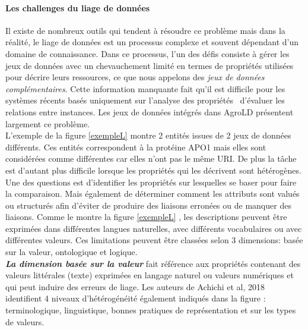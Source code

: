 \paragraph{Les challenges du liage de données}
Il existe de nombreux outils qui tendent à résoudre ce problème mais dans la réalité, le liage de données est un processus complexe et souvent dépendant d'un domaine de connaissance. Dans ce processus, l'un des défis consiste à gérer les jeux de données avec un chevauchement limité en termes de propriétés utilisées pour décrire leurs ressources, ce que nous appelons des \textit{jeux de données complémentaires}. Cette information manquante fait qu'il est difficile pour les systèmes récents basés uniquement sur l'analyse des propriétés~\cite{Jentzsch,Ngomo2011} d'évaluer les relations entre instances. Les jeux de données intégrés dans AgroLD présentent largement ce problème. \\

L’exemple de la figure \ref{exempleL} montre 2 entités issues de 2 jeux de données différents. Ces entités correspondent à la protéine APO1 mais elles sont considérées comme différentes car elles n’ont pas le même URI. De plus la tâche est d'autant plus difficile lorsque les propriétés qui les décrivent sont hétérogènes. Une des questions est d'identifier les propriétés sur lesquelles se baser pour faire la comparaison. Mais également de déterminer comment les attributs sont valués ou structurés afin d'éviter de produire des liaisons erronées ou de manquer des liaisons. Comme le montre la figure  \ref{exempleL} , les descriptions peuvent être exprimées dans différentes langues naturelles, avec différents vocabulaires ou avec différentes valeurs. Ces limitations peuvent être classées selon 3 dimensions: basée sur la valeur, ontologique et logique. \\


\textbf{\textit{La dimension basée sur la valeur}} fait référence aux propriétés contenant des valeurs littérales (texte) exprimées en langage naturel ou valeurs numériques et qui peut induire des erreurs de liage. Les auteurs de  Achichi et al, 2018~\cite{achichi2018} identifient 4 niveaux d'hétérogénéité également indiqués dans la figure : terminologique, linguistique, bonnes pratiques de représentation et sur les types de valeurs.\\

